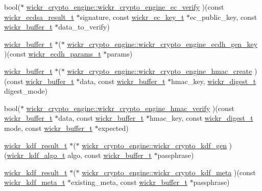 \begin{DoxyCompactItemize}
\item 
bool($\ast$ \mbox{\hyperlink{group__wickr__crypto__engine_gae541acc6433f6f5ffe84382ccd5e4f97}{wickr\+\_\+crypto\+\_\+engine\+::wickr\+\_\+crypto\+\_\+engine\+\_\+ec\+\_\+verify}} )(const \mbox{\hyperlink{structwickr__ecdsa__result}{wickr\+\_\+ecdsa\+\_\+result\+\_\+t}} $\ast$signature, const \mbox{\hyperlink{structwickr__ec__key}{wickr\+\_\+ec\+\_\+key\+\_\+t}} $\ast$ec\+\_\+public\+\_\+key, const \mbox{\hyperlink{structwickr__buffer}{wickr\+\_\+buffer\+\_\+t}} $\ast$data\+\_\+to\+\_\+verify)
\item 
\mbox{\hyperlink{structwickr__buffer}{wickr\+\_\+buffer\+\_\+t}} $\ast$($\ast$ \mbox{\hyperlink{group__wickr__crypto__engine_ga94bdc8d3b88ac04b9defe663afa48e78}{wickr\+\_\+crypto\+\_\+engine\+::wickr\+\_\+crypto\+\_\+engine\+\_\+ecdh\+\_\+gen\+\_\+key}} )(const \mbox{\hyperlink{structwickr__ecdh__params}{wickr\+\_\+ecdh\+\_\+params\+\_\+t}} $\ast$params)
\item 
\mbox{\hyperlink{structwickr__buffer}{wickr\+\_\+buffer\+\_\+t}} $\ast$($\ast$ \mbox{\hyperlink{group__wickr__crypto__engine_ga782e0e8786ecf8a55c8ae2aea2f178aa}{wickr\+\_\+crypto\+\_\+engine\+::wickr\+\_\+crypto\+\_\+engine\+\_\+hmac\+\_\+create}} )(const \mbox{\hyperlink{structwickr__buffer}{wickr\+\_\+buffer\+\_\+t}} $\ast$data, const \mbox{\hyperlink{structwickr__buffer}{wickr\+\_\+buffer\+\_\+t}} $\ast$hmac\+\_\+key, \mbox{\hyperlink{structwickr__digest}{wickr\+\_\+digest\+\_\+t}} digest\+\_\+mode)
\item 
bool($\ast$ \mbox{\hyperlink{group__wickr__crypto__engine_ga00c52a816403192af5b21d952265d0b6}{wickr\+\_\+crypto\+\_\+engine\+::wickr\+\_\+crypto\+\_\+engine\+\_\+hmac\+\_\+verify}} )(const \mbox{\hyperlink{structwickr__buffer}{wickr\+\_\+buffer\+\_\+t}} $\ast$data, const \mbox{\hyperlink{structwickr__buffer}{wickr\+\_\+buffer\+\_\+t}} $\ast$hmac\+\_\+key, const \mbox{\hyperlink{structwickr__digest}{wickr\+\_\+digest\+\_\+t}} mode, const \mbox{\hyperlink{structwickr__buffer}{wickr\+\_\+buffer\+\_\+t}} $\ast$expected)
\item 
\mbox{\hyperlink{structwickr__kdf__result}{wickr\+\_\+kdf\+\_\+result\+\_\+t}} $\ast$($\ast$ \mbox{\hyperlink{group__wickr__crypto__engine_ga5ab29968c993423df83c9f1a3d7e685d}{wickr\+\_\+crypto\+\_\+engine\+::wickr\+\_\+crypto\+\_\+kdf\+\_\+gen}} )(\mbox{\hyperlink{structwickr__kdf__algo}{wickr\+\_\+kdf\+\_\+algo\+\_\+t}} algo, const \mbox{\hyperlink{structwickr__buffer}{wickr\+\_\+buffer\+\_\+t}} $\ast$passphrase)
\item 
\mbox{\hyperlink{structwickr__kdf__result}{wickr\+\_\+kdf\+\_\+result\+\_\+t}} $\ast$($\ast$ \mbox{\hyperlink{group__wickr__crypto__engine_ga640cbc86ca36c4deb2c197de89dce7d1}{wickr\+\_\+crypto\+\_\+engine\+::wickr\+\_\+crypto\+\_\+kdf\+\_\+meta}} )(const \mbox{\hyperlink{structwickr__kdf__meta}{wickr\+\_\+kdf\+\_\+meta\+\_\+t}} $\ast$existing\+\_\+meta, const \mbox{\hyperlink{structwickr__buffer}{wickr\+\_\+buffer\+\_\+t}} $\ast$passphrase)
\end{DoxyCompactItemize}


